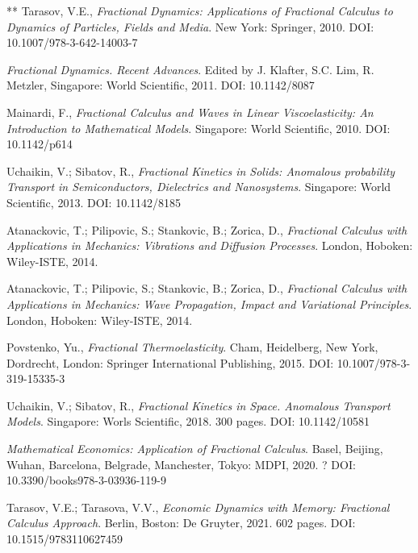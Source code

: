 \documentclass[12pt]{article}
\begin{document}
\begin{thebibliography}{**}
 Tarasov, V.E., 
\textit{Fractional Dynamics: Applications of 
Fractional Calculus to Dynamics of Particles, Fields and Media}. 
New York: Springer, 2010.
DOI: 10.1007/978-3-642-14003-7

\textit{Fractional Dynamics. Recent Advances}. 
Edited by J. Klafter, S.C. Lim, R. Metzler,
Singapore: World Scientific, 2011.
DOI: 10.1142/8087

 Mainardi, F.,
\textit{Fractional Calculus and Waves in Linear Viscoelasticity: 
An Introduction to Mathematical Models}. 
Singapore: World Scientific, 2010.
DOI: 10.1142/p614

 Uchaikin, V.; Sibatov, R.,
\textit{Fractional Kinetics in Solids: Anomalous probability 
Transport in Semiconductors, Dielectrics and Nanosystems}. 
Singapore: World Scientific, 2013.
DOI: 10.1142/8185

Atanackovic, T.; Pilipovic, S.; Stankovic, B.; Zorica, D.,
\textit{Fractional Calculus with Applications in Mechanics: 
Vibrations and Diffusion Processes}.
London, Hoboken: Wiley-ISTE, 2014.

Atanackovic, T.; Pilipovic, S.; Stankovic, B.; Zorica, D., 
\textit{Fractional Calculus with Applications in Mechanics: Wave Propagation, Impact and Variational Principles}. 
London, Hoboken: Wiley-ISTE, 2014.

 Povstenko, Yu., 
\textit{Fractional Thermoelasticity}.
Cham, Heidelberg, New York, Dordrecht, London: 
Springer International Publishing, 2015.
DOI: 10.1007/978-3-319-15335-3

 Uchaikin, V.; Sibatov, R.,
\textit{Fractional Kinetics in Space. Anomalous Transport Models}.
Singapore: Worls Scientific, 2018. 300 pages.
DOI: 10.1142/10581 


\textit{Mathematical Economics: Application of Fractional Calculus}. 
Basel, Beijing, Wuhan, Barcelona, Belgrade, Manchester, Tokyo: MDPI, 2020. ?%
DOI: 10.3390/books978-3-03936-119-9

 Tarasov, V.E.; Tarasova, V.V., 
\textit{Economic Dynamics with Memory: Fractional Calculus Approach}. 
Berlin, Boston: De Gruyter, 2021. 602 pages.
DOI: 10.1515/9783110627459


\end{thebibliography}
\end{document}
